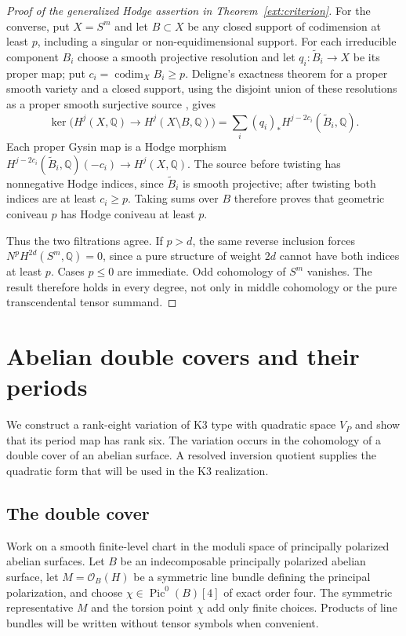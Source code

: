 \documentclass[11pt]{amsart}
\newcommand{\Q}{\mathbb Q}
\DeclareMathOperator{\Pic}{Pic}
\theoremstyle{definition}
\theoremstyle{remark}
\numberwithin{equation}{section}
\begin{document}
\begin{proof}[Proof of the generalized Hodge assertion in Theorem~\ref{ext:criterion}]
For the converse, put $X=S^m$ and let $B\subset X$ be any closed
support of codimension at least $p$, including a singular or
non-equidimensional support.  For each irreducible component $B_i$
choose a smooth projective resolution and let
$q_i:\widetilde B_i\to X$ be its proper map; put
$c_i=\operatorname{codim}_X B_i\ge p$.  Deligne's exactness theorem
for a proper smooth variety and a closed support, using the disjoint
union of these resolutions as a proper smooth surjective source
\cite[Proposition~8.2.7 and Corollary~8.2.8]{DeligneHodgeIII}, gives
\[
 \ker\bigl(H^j(X,\Q)\longrightarrow H^j(X\setminus B,\Q)\bigr)
   =\sum_i(q_i)_*H^{j-2c_i}(\widetilde B_i,\Q).
\]
Each proper Gysin map is a Hodge morphism
$H^{j-2c_i}(\widetilde B_i,\Q)(-c_i)\to H^j(X,\Q)$.
The source before twisting has nonnegative Hodge indices, since
$\widetilde B_i$ is smooth projective; after twisting both indices
are at least $c_i\ge p$.  Taking sums over $B$ therefore proves that
geometric coniveau $p$ has Hodge coniveau at least $p$.

Thus the two filtrations agree.  If $p>d$, the same reverse inclusion
forces $N^pH^{2d}(S^m,\Q)=0$, since a pure structure of weight $2d$
cannot have both indices at least $p$.  Cases $p\le0$ are immediate.
Odd cohomology of $S^m$ vanishes.
The result therefore holds in every degree, not only in middle
cohomology or the pure transcendental tensor summand.
\end{proof}


\section{Abelian double covers and their periods}
\label{geom:section}

We construct a rank-eight variation of K3 type with quadratic space
$V_P$ and show that its period map has rank six.  The variation occurs
in the cohomology of a double cover of an abelian surface.  A resolved
inversion quotient supplies the quadratic form that will be used in the
K3 realization.

\subsection{The double cover}

Work on a smooth finite-level chart in the moduli space of principally
polarized abelian surfaces.  Let $B$ be an indecomposable principally
polarized abelian surface, let $M=\mathcal O_B(H)$ be a symmetric line
bundle defining the principal polarization, and choose
$\chi\in\Pic^0(B)[4]$ of exact order four.  The symmetric representative
$M$ and the torsion point $\chi$ add only finite choices.  Products of
line bundles will be written without tensor symbols when convenient.
\end{document}
